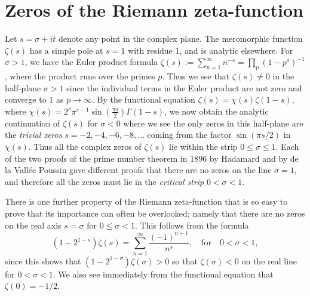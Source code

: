 \documentclass[11pt]{amsart}
\theoremstyle{remark}
\theoremstyle{plain}
\numberwithin{equation}{section}
\begin{document}



\section{Zeros of the Riemann zeta-function} 
\label{sec2}

Let $s=\sigma +it$ denote any point in the complex plane. The meromorphic function $\zeta(s)$ has a simple pole at $s=1$ with residue 1, and is analytic elsewhere. For $\sigma>1$, we have the Euler product formula $\zeta(s):=\sum_{n=1}^\infty n^{-s} = \prod_p(1- p^{s})^{-1}$, where the product runs over the primes $p$. Thus we see that $\zeta(s)\neq 0$ in the half-plane $\sigma >1$ since the individual terms in the Euler product are not zero and converge to $1$ as $p \to \infty$.
By the functional equation $\zeta(s) = \chi(s) \zeta(1-s)$, where $\chi(s) =2^s\pi^{s-1}\sin{\left(\frac{\pi s}{2}\right)}\Gamma(1-s)$, we now obtain the analytic continuation of $\zeta(s)$ for $\sigma <0$ where we see the only zeros in this half-plane are the {\it trivial zeros} $s = -2,-4,-6,-8, \ldots$ coming from the factor $\sin(\pi s/2)$ in $\chi(s)$. Thus all the complex zeros of $\zeta(s)$ lie within the strip $0\leq \sigma \leq 1$. Each of the two proofs of the prime number theorem in 1896 by Hadamard and by de la Vall{\'e}e Poussin gave different proofs that there are no zeros on the line $\sigma =1$, and therefore all the zeros must lie in the {\it critical strip} $0<\sigma <1$.

There is one further property of the Riemann zeta-function that is so easy to prove that its importance can often be overlooked; namely that there are no zeros on the real axis $s=\sigma$ for $0\le \sigma<1$. This follows from the formula 
\[(1 - 2^{1-s})\zeta(s) = \sum_{n=1}^{\infty} \frac{(-1)^{n+1}}{n^s}, \quad \text{for} \quad 0<\sigma <1, \]
since this shows that $(1-2^{1-\sigma})\zeta(\sigma) > 0$ so that $\zeta(\sigma) < 0$ on the real line for $0<\sigma <1$. We also see immediately from the functional equation that $\zeta(0)=-1/2$.
\end{document}
